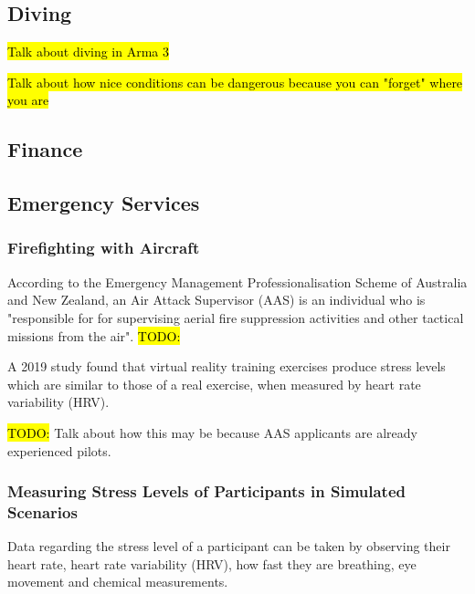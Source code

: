 \documentclass{article}
\begin{document}

\subsection{Diving}

\hl{Talk about diving in Arma 3}

\hl{Talk about how nice conditions can be dangerous because you can "forget" where you are}

\subsection{Finance}

\subsection{Emergency Services}

\subsubsection{Firefighting with Aircraft}

According to the Emergency Management Professionalisation Scheme of Australia and New Zealand, an Air Attack Supervisor (AAS) is an individual who is "responsible for for supervising aerial fire suppression activities and other tactical missions from the air". \hl{TODO:}


A 2019 study found that virtual reality training exercises produce stress levels which are similar to those of a real exercise, when measured by heart rate variability (HRV). \cite{8797889}

\hl{TODO:} Talk about how this may be because AAS applicants are already experienced pilots.

\subsubsection{Measuring Stress Levels of Participants in Simulated Scenarios}

Data regarding the stress level of a participant can be taken by observing their heart rate, heart rate variability (HRV), how fast they are breathing, eye movement and chemical measurements. \cite{8797889}
\end{document}
